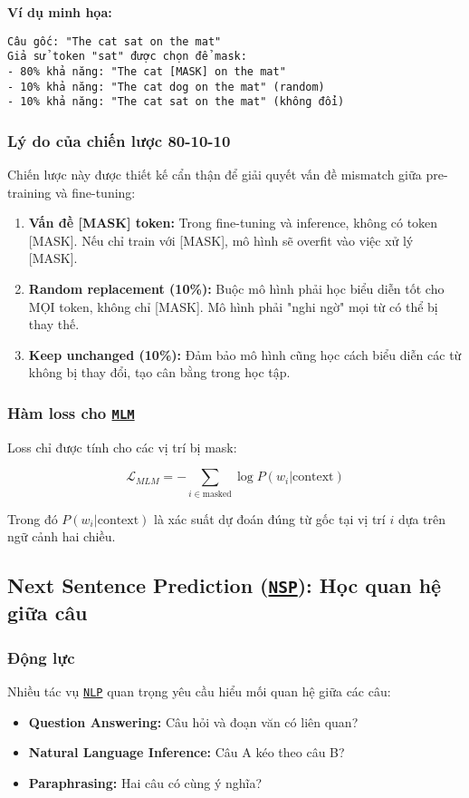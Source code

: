 \textbf{Ví dụ minh họa:}
\begin{verbatim}
Câu gốc: "The cat sat on the mat"
Giả sử token "sat" được chọn để mask:
- 80% khả năng: "The cat [MASK] on the mat"
- 10% khả năng: "The cat dog on the mat" (random)
- 10% khả năng: "The cat sat on the mat" (không đổi)
\end{verbatim}

\subsubsection{Lý do của chiến lược 80-10-10}
Chiến lược này được thiết kế cẩn thận để giải quyết vấn đề mismatch giữa pre-training và fine-tuning:

\begin{enumerate}
    \item \textbf{Vấn đề [MASK] token:} Trong fine-tuning và inference, không có token [MASK]. Nếu chỉ train với [MASK], mô hình sẽ overfit vào việc xử lý [MASK].
    
    \item \textbf{Random replacement (10\%):} Buộc mô hình phải học biểu diễn tốt cho MỌI token, không chỉ [MASK]. Mô hình phải "nghi ngờ" mọi từ có thể bị thay thế.
    
    \item \textbf{Keep unchanged (10\%):} Đảm bảo mô hình cũng học cách biểu diễn các từ không bị thay đổi, tạo cân bằng trong học tập.
\end{enumerate}

\subsubsection{Hàm loss cho \hyperref[acro:mlm]{\texttt{MLM}}}
Loss chỉ được tính cho các vị trí bị mask:

\begin{equation}
\mathcal{L}_{MLM} = -\sum_{i \in \text{masked}} \log P(w_i | \text{context})
\label{eq:mlm_loss}
\end{equation}

Trong đó $P(w_i | \text{context})$ là xác suất dự đoán đúng từ gốc tại vị trí $i$ dựa trên ngữ cảnh hai chiều.

\subsection{Next Sentence Prediction (\hyperref[acro:nsp]{\texttt{NSP}}): Học quan hệ giữa câu}
\label{ssec:nsp}

\subsubsection{Động lực}
Nhiều tác vụ \hyperref[acro:nlp]{\texttt{NLP}} quan trọng yêu cầu hiểu mối quan hệ giữa các câu:
\begin{itemize}
    \item \textbf{Question Answering:} Câu hỏi và đoạn văn có liên quan?
    \item \textbf{Natural Language Inference:} Câu A kéo theo câu B?
    \item \textbf{Paraphrasing:} Hai câu có cùng ý nghĩa?
\end{itemize}

